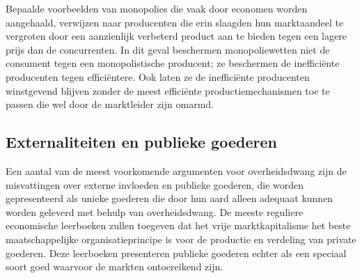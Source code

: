 \documentclass[
  a5paper,
  smalldemyvopaper,11pt,twoside,onecolumn,openright,extrafontsizes,
hidelinks]{memoir}
\begin{document}
Bepaalde voorbeelden van monopolies die vaak door economen worden
aangehaald, verwijzen naar producenten die erin slaagden hun
marktaandeel te vergroten door een aanzienlijk verbeterd product aan te
bieden tegen een lagere prijs dan de concurrenten. In dit geval
beschermen monopoliewetten niet de consument tegen een monopolistische
producent; ze beschermen de inefficiënte producenten tegen efficiëntere.
Ook laten ze de inefficiënte producenten winstgevend blijven zonder de
meest efficiënte productiemechanismen toe te passen die wel door de
marktleider zijn omarmd.

\subsection{Externaliteiten en publieke
goederen}\label{externaliteiten-en-publieke-goederen}

Een aantal van de meest voorkomende argumenten voor overheidsdwang zijn
de misvattingen over externe invloeden en publieke goederen, die worden
gepresenteerd als unieke goederen die door hun aard alleen adequaat
kunnen worden geleverd met behulp van overheidsdwang. De meeste
reguliere economische leerboeken zullen toegeven dat het vrije
marktkapitalisme het beste maatschappelijke organisatieprincipe is voor
de productie en verdeling van private goederen. Deze leerboeken
presenteren publieke goederen echter als een speciaal soort goed
waarvoor de markten ontoereikend zijn.
\end{document}
